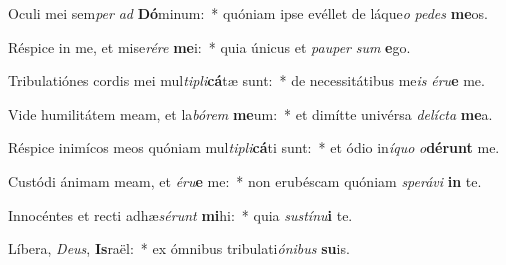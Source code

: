 \item Oculi mei sem\textit{per} \textit{ad} \textbf{Dó}minum:~* quóniam ipse evéllet de láque\textit{o} \textit{pe}\textit{des} \textbf{me}os.
\item Réspice in me, et mise\textit{ré}\textit{re} \textbf{me}i:~* quia únicus et \textit{pau}\textit{per} \textit{sum} \textbf{e}go.
\item Tribulatiónes cordis mei mul\textit{ti}\textit{pli}\textbf{cá}tæ sunt:~* de necessitátibus me\textit{is} \textit{é}\textit{ru}\textbf{e} me.
\item Vide humilitátem meam, et la\textit{bó}\textit{rem} \textbf{me}um:~* et dimítte univérsa \textit{de}\textit{líc}\textit{ta} \textbf{me}a.
\item Réspice inimícos meos quóniam mul\textit{ti}\textit{pli}\textbf{cá}ti sunt:~* et ódio in\textit{í}\textit{quo} \textit{o}\textbf{dé}\textbf{runt} me.
\item Custódi ánimam meam, et \textit{é}\textit{ru}\textbf{e} me:~* non erubéscam quóniam \textit{spe}\textit{rá}\textit{vi} \textbf{in} te.
\item Innocéntes et recti adhæ\textit{sé}\textit{runt} \textbf{mi}hi:~* quia \textit{sus}\textit{tí}\textit{nu}\textbf{i} te.
\item Líbera, \textit{De}\textit{us}, \textbf{Is}raël:~* ex ómnibus tribulati\textit{ó}\textit{ni}\textit{bus} \textbf{su}is.
